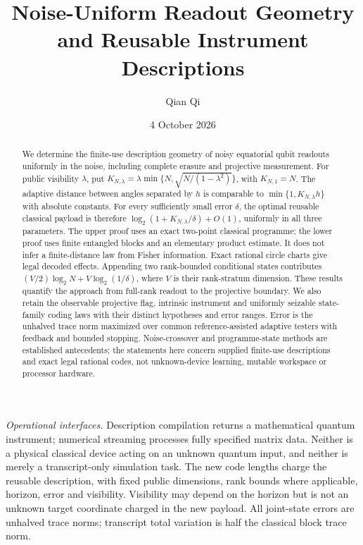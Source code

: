 \documentclass[11pt]{amsart}
\title[Noise-uniform readout geometry]{Noise-Uniform Readout Geometry\\and Reusable Instrument Descriptions}
\author{Qian Qi}
\date{4 October 2026}
\numberwithin{equation}{section}
\theoremstyle{definition}\newtheorem{definition}[theorem]{Definition}
\theoremstyle{remark}\newtheorem{remark}[theorem]{Remark}
\begin{document}
\raggedbottom
\begin{abstract}
We determine the finite-use description geometry of noisy equatorial
qubit readouts uniformly in the noise, including complete erasure and
projective measurement. For public visibility $\lambda$, put
$K_{N,\lambda}=\lambda\min\{N,\sqrt{N/(1-\lambda^2)}\}$, with
$K_{N,1}=N$. The adaptive distance between angles separated by $h$
is comparable to $\min\{1,K_{N,\lambda}h\}$ with absolute constants.
For every sufficiently small error $\delta$, the optimal reusable
classical payload is therefore
$\log_2(1+K_{N,\lambda}/\delta)+O(1)$, uniformly in all three
parameters. The upper proof uses an exact two-point classical programme;
the lower proof uses finite entangled blocks and an elementary product
estimate. It does not infer a finite-distance law from Fisher
information. Exact rational circle charts give legal decoded effects.
Appending two rank-bounded conditional states contributes
$(V/2)\log_2N+V\log_2(1/\delta)$, where $V$ is their rank-stratum
dimension. These results quantify the approach from full-rank readout
to the projective boundary. We also retain the observable projective
flag, intrinsic instrument and uniformly seizable state-family coding
laws with their distinct hypotheses and error ranges. Error is the
unhalved trace norm maximized over common reference-assisted adaptive
testers with feedback and bounded stopping. Noise-crossover and
programme-state methods are established antecedents; the statements here
concern supplied finite-use descriptions and exact legal rational codes,
not unknown-device learning, mutable workspace or processor hardware.
\end{abstract}
\maketitle
\noindent\textit{Operational interfaces.}
Description compilation returns a mathematical quantum instrument;
numerical streaming processes fully specified matrix data. Neither is a
physical classical device acting on an unknown quantum input, and
neither is merely a transcript-only simulation task. The new code lengths
charge the reusable description, with fixed public dimensions, rank bounds where applicable, horizon,
error and visibility. Visibility may depend on the horizon but is not an
unknown target coordinate charged in the new payload.
All joint-state errors
are unhalved trace norms; transcript total variation is half the classical
block trace norm.

















\end{document}
